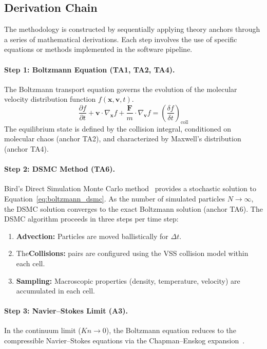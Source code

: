 \subsection{Derivation Chain}
The methodology is constructed by sequentially applying theory anchors through a series of mathematical derivations. Each step involves the use of specific equations or methods implemented in the software pipeline.

\paragraph{Step 1: Boltzmann Equation (TA1, TA2, TA4).}
The Boltzmann transport equation governs the evolution of the molecular velocity distribution function $f(\mathbf{x}, \mathbf{v}, t)$.
\begin{equation}
\frac{\partial f}{\partial t} + \mathbf{v} \cdot \nabla_{\mathbf{x}} f + \frac{\mathbf{F}}{m} \cdot \nabla_{\mathbf{v}} f = \left(\frac{\delta f}{\delta t}\right)_{\text{coll}}
\label{eq:boltzmann_dsmc}
\end{equation}
The equilibrium state is defined by the collision integral, conditioned on molecular chaos (anchor TA2), and characterized by Maxwell's distribution (anchor TA4).

\paragraph{Step 2: DSMC Method (TA6).}
Bird's Direct Simulation Monte Carlo method~\cite{bird1994molecular} provides a stochastic solution to Equation~\eqref{eq:boltzmann_dsmc}. As the number of simulated particles $N \to \infty$, the DSMC solution converges to the exact Boltzmann solution (anchor TA6). The DSMC algorithm proceeds in three steps per time step:
\begin{enumerate}
    \item \textbf{Advection:} Particles are moved ballistically for $\Delta t$.

    \item The\textbf{Collisions:} pairs are configured using the VSS collision model within each cell.

    \item \textbf{Sampling:} Macroscopic properties (density, temperature, velocity) are accumulated in each cell.
\end{enumerate}

\paragraph{Step 3: Navier--Stokes Limit (A3).}
In the continuum limit ($Kn \to 0$), the Boltzmann equation reduces to the compressible Navier--Stokes equations via the Chapman--Enskog expansion~\cite{chapman1970kinetic}.

